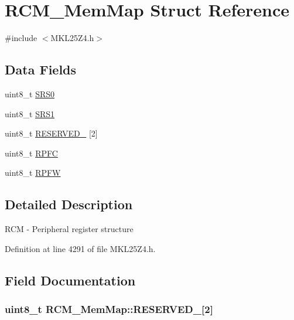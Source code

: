 \hypertarget{struct_r_c_m___mem_map}{}\section{R\+C\+M\+\_\+\+Mem\+Map Struct Reference}
\label{struct_r_c_m___mem_map}


{\ttfamily \#include $<$M\+K\+L25\+Z4.\+h$>$}

\subsection*{Data Fields}
\begin{DoxyCompactItemize}
\item 
uint8\+\_\+t \hyperlink{struct_r_c_m___mem_map_aa28b91bdb2e1acc454f7bcb9ad26efb7}{S\+R\+S0}
\item 
uint8\+\_\+t \hyperlink{struct_r_c_m___mem_map_a8e7926e6f51e64e63e5ed3adb7aee612}{S\+R\+S1}
\item 
uint8\+\_\+t \hyperlink{struct_r_c_m___mem_map_a5eaf5837cabca1357756d67c06f69ca6}{R\+E\+S\+E\+R\+V\+E\+D\+\_} \mbox{[}2\mbox{]}
\item 
uint8\+\_\+t \hyperlink{struct_r_c_m___mem_map_ace89c039f8342f8b5dd26c3c7b8309a2}{R\+P\+FC}
\item 
uint8\+\_\+t \hyperlink{struct_r_c_m___mem_map_ac458f95f6aa234285f568694a5b8240d}{R\+P\+FW}
\end{DoxyCompactItemize}


\subsection{Detailed Description}
R\+CM -\/ Peripheral register structure 

Definition at line 4291 of file M\+K\+L25\+Z4.\+h.



\subsection{Field Documentation}
\subsubsection[{\texorpdfstring{R\+E\+S\+E\+R\+V\+E\+D\+\_\+0}{RESERVED_0}}]{\setlength{\rightskip}{0pt plus 5cm}uint8\+\_\+t R\+C\+M\+\_\+\+Mem\+Map\+::\+R\+E\+S\+E\+R\+V\+E\+D\+\_\mbox{[}2\mbox{]}}\hypertarget{struct_r_c_m___mem_map_a5eaf5837cabca1357756d67c06f69ca6}{}\label{struct_r_c_m___mem_map_a5eaf5837cabca1357756d67c06f69ca6}


